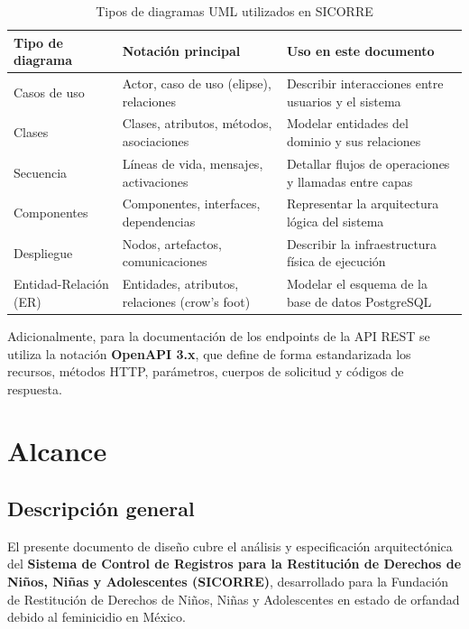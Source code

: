 \begin{table}[h!]
	\centering
	\caption{Tipos de diagramas UML utilizados en SICORRE}
	\begin{tabular}{|p{4cm}|p{4cm}|p{5.5cm}|}
		\hline
		\textbf{Tipo de diagrama}      & \textbf{Notación principal}               & \textbf{Uso en este documento}                          \\ \hline
		Casos de uso                   & Actor, caso de uso (elipse), relaciones   & Describir interacciones entre usuarios y el sistema     \\ \hline
		Clases                         & Clases, atributos, métodos, asociaciones  & Modelar entidades del dominio y sus relaciones          \\ \hline
		Secuencia                      & Líneas de vida, mensajes, activaciones    & Detallar flujos de operaciones y llamadas entre capas   \\ \hline
		Componentes                    & Componentes, interfaces, dependencias     & Representar la arquitectura lógica del sistema          \\ \hline
		Despliegue                     & Nodos, artefactos, comunicaciones         & Describir la infraestructura física de ejecución        \\ \hline
		Entidad-Relación (ER)          & Entidades, atributos, relaciones (crow's foot) & Modelar el esquema de la base de datos PostgreSQL  \\ \hline
	\end{tabular}
	\label{tab:notacion}
\end{table}

Adicionalmente, para la documentación de los endpoints de la API REST se utiliza la
notación \textbf{OpenAPI 3.x}, que define de forma estandarizada los recursos, métodos
HTTP, parámetros, cuerpos de solicitud y códigos de respuesta.



\section{Alcance}

\subsection*{Descripción general}

El presente documento de diseño cubre el análisis y especificación arquitectónica del
\textbf{Sistema de Control de Registros para la Restitución de Derechos de Niños, Niñas
	y Adolescentes (SICORRE)}, desarrollado para la Fundación de Restitución de Derechos de
Niños, Niñas y Adolescentes en estado de orfandad debido al feminicidio en México.

